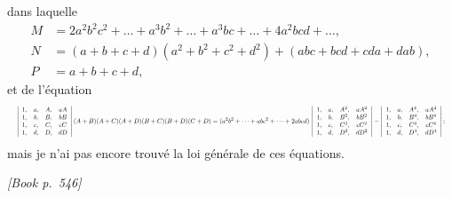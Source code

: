\documentclass[11pt]{article}
\begin{document}
dans laquelle
\[
\begin{aligned}
M &= 2a^{2}b^{2}c^{2} + \dots + a^{3}b^{2} + \dots + a^{3}bc + \dots + 4a^{2}bcd + \dots,\\
N &= (a + b + c + d)(a^{2} + b^{2} + c^{2} + d^{2}) + (abc + bcd + cda + dab),\\
P &= a + b + c + d,
\end{aligned}
\]
et de l'\'equation
\[ \resizebox{\textwidth}{!}{$\displaystyle
\left|\begin{array}{cccc}1, & a, & A, & aA\\ 1, & b, & B, & bB\\ 1, & c, & C, & cC\\ 1, & d, & D, & dD\end{array}\right|(A + B)(A + C)(A + D)(B + C)(B + D)(C + D) = (a^{2}b^{2} + \dots + abc^{2} + \dots + 2abcd)\,\left|\begin{array}{cccc}1, & a, & A^{2}, & aA^{2}\\ 1, & b, & B^{2}, & bB^{2}\\ 1, & c, & C^{2}, & cC^{2}\\ 1, & d, & D^{2}, & dD^{2}\end{array}\right| - \left|\begin{array}{cccc}1, & a, & A^{4}, & aA^{4}\\ 1, & b, & B^{4}, & bB^{4}\\ 1, & c, & C^{4}, & cC^{4}\\ 1, & d, & D^{4}, & dD^{4}\end{array}\right|;
$} \]
mais je n'ai pas encore trouv\'e la loi g\'en\'erale de ces \'equations.

\medskip
\noindent\textit{[Book p.~546]}\hfill

\smallskip
\end{document}
